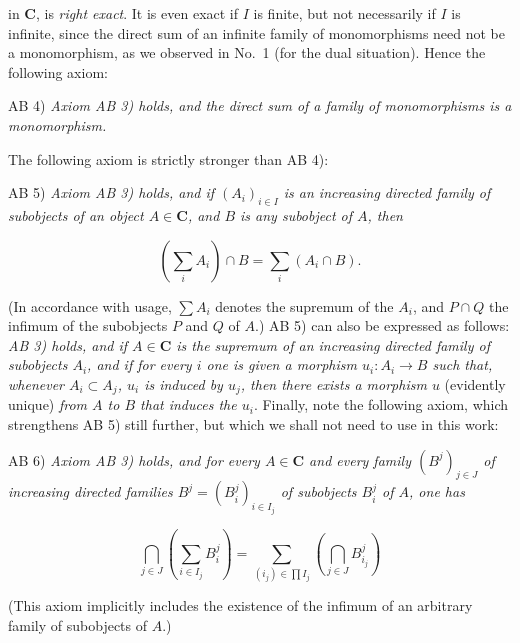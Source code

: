 
\noindent in $\mathbf{C}$, is \textit{right exact}. It is even exact if $I$ is finite,
but not necessarily if $I$ is infinite, since the direct sum of an infinite
family of monomorphisms need not be a monomorphism, as we observed in No.~1
(for the dual situation). Hence the following axiom:

\noindent AB 4) \textit{Axiom \textup{AB 3)} holds, and the direct sum of a
family of monomorphisms is a monomorphism.}

The following axiom is strictly stronger than AB 4):

\noindent AB 5) \textit{Axiom \textup{AB 3)} holds, and if $(A_i)_{i\in I}$ is
an increasing directed family of subobjects of an object $A\in\mathbf{C}$, and $B$ is
any subobject of $A$, then}

\[
  \left(\sum_i A_i\right)\cap B=\sum_i(A_i\cap B).
\]

\noindent (In accordance with usage, $\displaystyle\sum A_i$ denotes the supremum of the
$A_i$, and $P\cap Q$ the infimum of the subobjects $P$ and $Q$ of $A$.)
AB 5) can also be expressed as follows: \textit{\textup{AB 3)} holds, and if $A\in\mathbf{C}$
is the supremum of an increasing directed family of subobjects $A_i$, and if
for every $i$ one is given a morphism $u_i:A_i\to B$ such that,
whenever $A_i\subset A_j$, $u_i$ is induced by $u_j$, then there exists a
morphism $u$} (evidently unique) \textit{from $A$ to $B$ that induces the
$u_i$}. Finally, note the following axiom, which strengthens AB 5) still
further, but which we shall not need to use in this work:

\noindent AB 6) \textit{Axiom \textup{AB 3)} holds, and for every $A\in\mathbf{C}$ and
every family $(B^j)_{j\in J}$ of increasing directed families
$B^j=(B_i^j)_{i\in I_j}$ of subobjects $B_i^j$ of $A$, one has}

\[
 \bigcap_{j\in J}\left(\sum_{i\in I_j}B_i^j\right)
 =\sum_{(i_j)\in\prod I_j}
   \left(\bigcap_{j\in J}B_{i_j}^j\right)
\]

\noindent (This axiom implicitly includes the existence of the infimum of an
arbitrary family of subobjects of $A$.)

